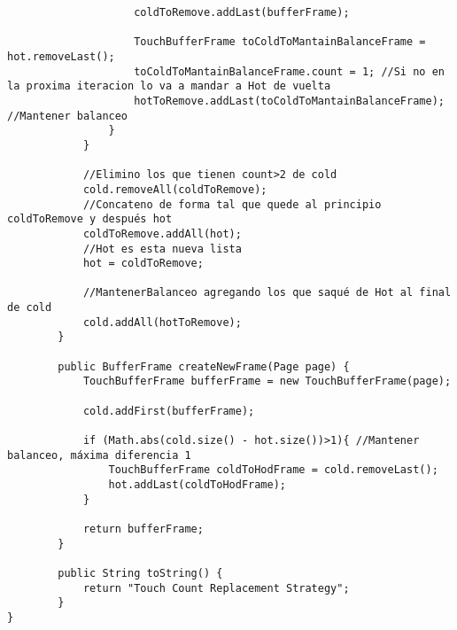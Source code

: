 \begin{lstlisting}
        			coldToRemove.addLast(bufferFrame);
        			
        			TouchBufferFrame toColdToMantainBalanceFrame = hot.removeLast();
					toColdToMantainBalanceFrame.count = 1; //Si no en la proxima iteracion lo va a mandar a Hot de vuelta
					hotToRemove.addLast(toColdToMantainBalanceFrame); //Mantener balanceo
        		}  		
        	}
        	
    		//Elimino los que tienen count>2 de cold
    		cold.removeAll(coldToRemove);
    		//Concateno de forma tal que quede al principio coldToRemove y después hot
    		coldToRemove.addAll(hot);
    		//Hot es esta nueva lista
    		hot = coldToRemove;
    		
    		//MantenerBalanceo agregando los que saqué de Hot al final de cold 
    		cold.addAll(hotToRemove);
        }

        public BufferFrame createNewFrame(Page page) {
        	TouchBufferFrame bufferFrame = new TouchBufferFrame(page);
        	
        	cold.addFirst(bufferFrame);
        	
        	if (Math.abs(cold.size() - hot.size())>1){ //Mantener balanceo, máxima diferencia 1
        		TouchBufferFrame coldToHodFrame = cold.removeLast();
        		hot.addLast(coldToHodFrame);
        	}
        	
        	return bufferFrame;     
        }
        
        public String toString() {
            return "Touch Count Replacement Strategy";
        }
}
\end{lstlisting}
